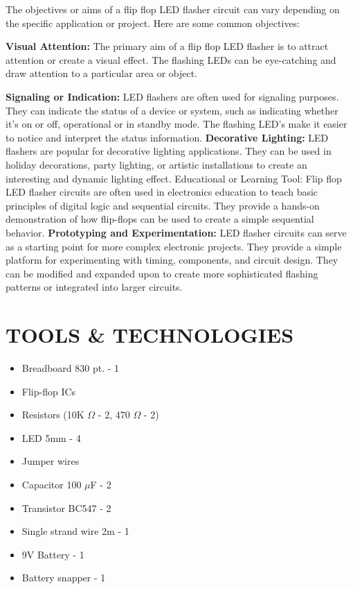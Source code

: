\documentclass{article}
\begin{document}
The objectives or aims of a flip flop LED flasher circuit can vary depending on the specific application or project. Here are some common objectives:

\textbf{Visual Attention:} The primary aim of a flip flop LED flasher is to attract attention or create a visual effect. The flashing LEDs can be eye-catching and draw attention to a particular area or object.

\textbf{Signaling or Indication:} LED flashers are often used for signaling purposes. They can indicate the status of a device or system, such as indicating whether it's on or off, operational or in standby mode. The flashing LED's make it easier to notice and interpret the status information.
\textbf{Decorative Lighting:} LED flashers are popular for decorative lighting applications. They can be used in holiday decorations, party lighting, or artistic installations to create an interesting and dynamic lighting effect.
Educational or Learning Tool: Flip flop LED flasher circuits are often used in electronics education to teach basic principles of digital logic and sequential circuits. They provide a hands-on demonstration of how flip-flops can be used to create a simple sequential behavior.
\textbf{Prototyping and Experimentation:} LED flasher circuits can serve as a starting point for more complex electronic projects. They provide a simple platform for experimenting with timing, components, and circuit design. They can be modified and expanded upon to create more sophisticated flashing patterns or integrated into larger circuits.

\section{TOOLS \& TECHNOLOGIES}

\begin{itemize}
\item Breadboard 830 pt. - 1
\item Flip-flop ICs
\item Resistors (10K $\Omega$ - 2, 470 $\Omega$ - 2)
\item LED 5mm - 4
\item Jumper wires
\item Capacitor 100 $\mu$F - 2
\item Transistor BC547 - 2
\item Single strand wire 2m - 1
\item 9V Battery - 1
\item Battery snapper - 1
\end{itemize}
\end{document}
